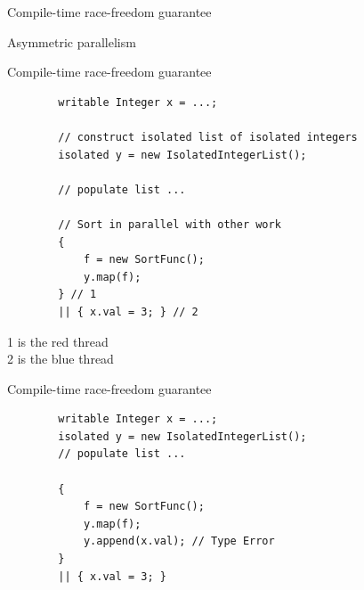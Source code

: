 \documentclass{beamer}
\begin{document}

\begin{frame}{Compile-time race-freedom guarantee}
	\begin{center}
	\end{center}
	Asymmetric parallelism
\end{frame}

\begin{frame}[fragile]{Compile-time race-freedom guarantee}
	\begin{lstlisting}
		writable Integer x = ...;
		
		// construct isolated list of isolated integers
		isolated y = new IsolatedIntegerList();
		
		// populate list ...
		
		// Sort in parallel with other work
		{
		    f = new SortFunc();
		    y.map(f);
		} // 1
		|| { x.val = 3; } // 2
	\end{lstlisting}
	1 is the red thread\\
	2 is the blue thread
\end{frame}

\begin{frame}[fragile]{Compile-time race-freedom guarantee}
	\begin{lstlisting}
		writable Integer x = ...;
		isolated y = new IsolatedIntegerList();
		// populate list ...
		
		{
		    f = new SortFunc();
		    y.map(f);
		    y.append(x.val); // Type Error
		}
		|| { x.val = 3; }
	\end{lstlisting}
\end{frame}

\end{document}
